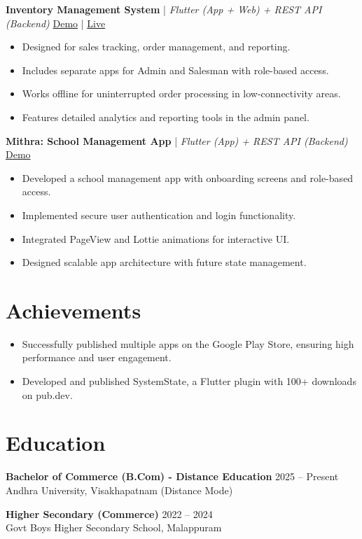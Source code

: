 \documentclass[a4paper,11pt]{article}
\begin{document}
\textbf{Inventory Management System} | \textit{Flutter (App + Web) + REST API (Backend)} \hfill \href{}{Demo} | \href{}{Live}
\begin{itemize}[leftmargin=1.5em, itemsep=2pt, topsep=4pt]
    \item Designed for sales tracking, order management, and reporting.
    \item Includes separate apps for Admin and Salesman with role-based access.
    \item Works offline for uninterrupted order processing in low-connectivity areas.
    \item Features detailed analytics and reporting tools in the admin panel.
\end{itemize}

\textbf{Mithra: School Management App} | \textit{Flutter (App) + REST API (Backend)} \hfill \href{}{Demo}
\begin{itemize}[leftmargin=1.5em, itemsep=2pt, topsep=4pt]
    \item Developed a school management app with onboarding screens and role-based access.
    \item Implemented secure user authentication and login functionality.
    \item Integrated PageView and Lottie animations for interactive UI.
    \item Designed scalable app architecture with future state management.
\end{itemize}

\section{Achievements}
\begin{itemize}[leftmargin=1.5em, itemsep=2pt, topsep=4pt]
    \item Successfully published multiple apps on the Google Play Store, ensuring high performance and user engagement.
    \item Developed and published SystemState, a Flutter plugin with 100+ downloads on pub.dev.
\end{itemize}

\section{Education}

\textbf{Bachelor of Commerce (B.Com) - Distance Education} \hfill 2025 -- Present \\
Andhra University, Visakhapatnam (Distance Mode)

\vspace{8pt}

\textbf{Higher Secondary (Commerce)} \hfill 2022 -- 2024 \\
Govt Boys Higher Secondary School, Malappuram
\end{document}
